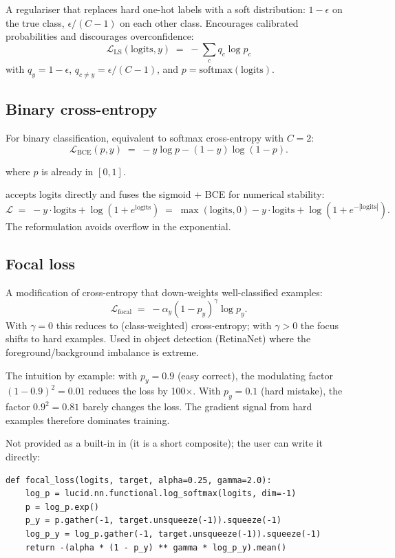A regulariser that replaces hard one-hot labels with a soft
distribution: $1 - \epsilon$ on the true class, $\epsilon /
(C-1)$ on each other class. Encourages calibrated probabilities
and discourages overconfidence:
\[
\mathcal{L}_{\text{LS}}(\mathrm{logits}, y) \;=\; -\sum_c q_c \log p_c
\]
with $q_y = 1 - \epsilon$, $q_{c \neq y} = \epsilon / (C-1)$, and
$p = \mathrm{softmax}(\mathrm{logits})$.

\subsection{Binary cross-entropy}
\label{ssec:losses:bce}

For binary classification, equivalent to softmax cross-entropy
with $C = 2$:
\[
\mathcal{L}_{\text{BCE}}(p, y) \;=\; -y \log p - (1-y) \log(1-p).
\]

 where $p$ is already in $[0, 1]$.

 accepts logits directly and
fuses the sigmoid + BCE for numerical stability:
\[
\mathcal{L} \;=\; -y \cdot \mathrm{logits} + \log(1 + e^{\mathrm{logits}})
\;=\; \max(\mathrm{logits}, 0) - y \cdot \mathrm{logits} + \log(1 + e^{-|\mathrm{logits}|}).
\]
The reformulation avoids overflow in the exponential.

\subsection{Focal loss}
\label{ssec:losses:focal}

A modification of cross-entropy \cite{lin_focal_2017} that
down-weights well-classified examples:
\[
\mathcal{L}_{\text{focal}} \;=\; -\alpha_y (1 - p_y)^\gamma \log p_y.
\]
With $\gamma = 0$ this reduces to (class-weighted) cross-entropy;
with $\gamma > 0$ the focus shifts to hard examples. Used in
object detection (RetinaNet) where the foreground/background
imbalance is extreme.

The intuition by example: with $p_y = 0.9$ (easy correct), the
modulating factor $(1 - 0.9)^2 = 0.01$ reduces the loss by
100$\times$. With $p_y = 0.1$ (hard mistake), the factor
$0.9^2 = 0.81$ barely changes the loss. The gradient signal
from hard examples therefore dominates training.

Not provided as a built-in in  (it is a
short composite); the user can write it directly:

\begin{lstlisting}[style=lucid,language=LucidPython]
def focal_loss(logits, target, alpha=0.25, gamma=2.0):
    log_p = lucid.nn.functional.log_softmax(logits, dim=-1)
    p = log_p.exp()
    p_y = p.gather(-1, target.unsqueeze(-1)).squeeze(-1)
    log_p_y = log_p.gather(-1, target.unsqueeze(-1)).squeeze(-1)
    return -(alpha * (1 - p_y) ** gamma * log_p_y).mean()
\end{lstlisting}

